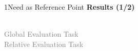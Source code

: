 \documentclass[xcolor=table,9pt,aspectratio=169]{beamer}
\begin{document}
\begin{frame}{\vspace*{10mm}1\hspace*{1em}Need as Reference Point}
\textbf{Results (1/2)}\\
\begin{multicols}{2}
   \begin{center}
      \\
      \textcolor{gray}{Global Evaluation Task}
      \\
      \textcolor{gray}{Relative Evaluation Task}
   \end{center}

\end{multicols}
\end{frame}
\end{document}
